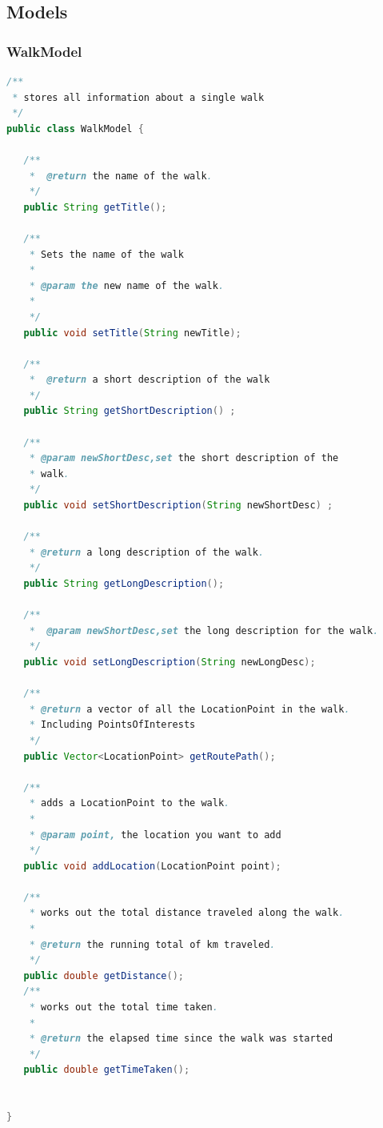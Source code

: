 \documentclass[12pt]{article}
\begin{document}
\subsection{Models}
\subsubsection{WalkModel}
\begin{lstlisting}[language=java]
/**
 * stores all information about a single walk
 */
public class WalkModel {    

   /**
    *  @return the name of the walk.
    */
   public String getTitle();

   /**
    * Sets the name of the walk
    * 
    * @param the new name of the walk.
    * 
    */
   public void setTitle(String newTitle);

   /**
    *  @return a short description of the walk 
    */
   public String getShortDescription() ;

   /**
    * @param newShortDesc,set the short description of the
    * walk. 
    */
   public void setShortDescription(String newShortDesc) ;

   /** 
    * @return a long description of the walk.
    */
   public String getLongDescription();

   /**
    *  @param newShortDesc,set the long description for the walk.
    */
   public void setLongDescription(String newLongDesc);

   /**
    * @return a vector of all the LocationPoint in the walk. 
    * Including PointsOfInterests
    */
   public Vector<LocationPoint> getRoutePath();

   /** 
    * adds a LocationPoint to the walk. 
    * 
    * @param point, the location you want to add
    */
   public void addLocation(LocationPoint point);

   /**
    * works out the total distance traveled along the walk.
    * 
    * @return the running total of km traveled. 
    */
   public double getDistance();
   /** 
    * works out the total time taken.
    * 
    * @return the elapsed time since the walk was started
    */
   public double getTimeTaken();


}
\end{lstlisting}
\end{document}
